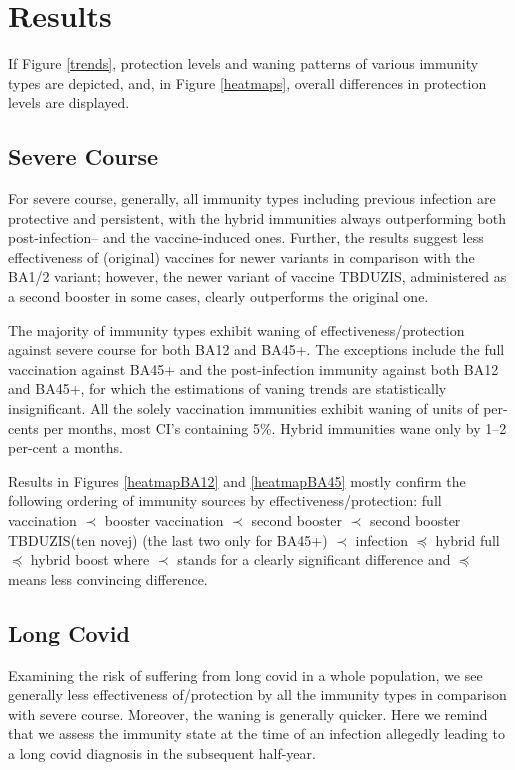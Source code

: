 \documentclass[sn-basic]{sn-jnl}%
\theoremstyle{thmstyleone}%
\theoremstyle{thmstyletwo}%
\theoremstyle{thmstylethree}%
\begin{document}
\section{Results}

If Figure \ref{trends}, protection levels and waning patterns of various immunity types are depicted, and, in Figure \ref{heatmaps}, overall differences in protection levels are displayed. 

\subsection{Severe Course}

For severe course, generally, all immunity types including previous infection are protective and persistent, with the hybrid immunities always outperforming both post-infection-- and the vaccine-induced ones. Further, the results suggest less effectiveness of (original) vaccines for newer variants in comparison with the BA1/2 variant; however, the newer variant of vaccine TBDUZIS, administered as a second booster in some cases, clearly outperforms the original one. 

The majority of immunity types exhibit waning of effectiveness/protection against severe course for both BA12 and BA45+. The exceptions include the full vaccination against BA45+ and the post-infection immunity against both BA12 and BA45+, for which the estimations of vaning trends are statistically insignificant. All the solely vaccination immunities exhibit waning of units of per-cents per months, most CI's containing 5\%. Hybrid immunities wane only by 1--2 per-cent a months.

Results in Figures \ref{heatmapBA12} and \ref{heatmapBA45} mostly confirm the following ordering of immunity sources by effectiveness/protection: full vaccination $\prec$ booster vaccination $\prec$ second booster $\prec$ second booster TBDUZIS(ten novej) (the last two only for BA45+) $\prec$ infection $\preceq$ hybrid full $\preceq$ hybrid boost where $\prec$ stands for a clearly significant difference and $\preceq$ means less convincing difference.

\subsection{Long Covid}

Examining the risk of suffering from long covid in a whole population, we see generally less effectiveness of/protection by all the immunity types in comparison with severe course. Moreover, the waning is generally quicker. Here we remind that we assess the immunity state at the time of an infection allegedly leading to a long covid diagnosis in the subsequent half-year. 
\end{document}
